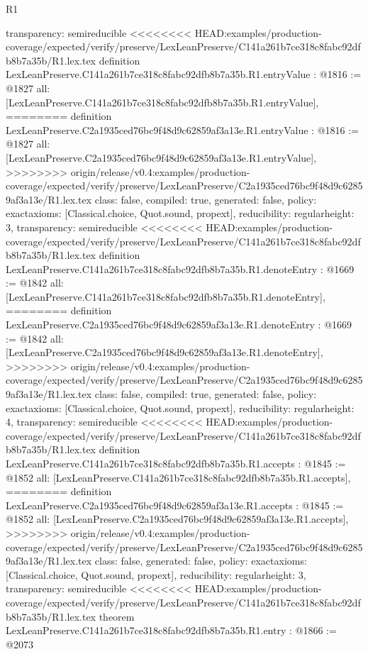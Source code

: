 \begin{lexlean}{R1}
\begin{coremodule}
{{{{{{{{{{{{{{{  transparency: semireducible
}
<<<<<<<< HEAD:examples/production-coverage/expected/verify/preserve/LexLeanPreserve/C141a261b7ce318c8fabc92dfb8b7a35b/R1.lex.tex
definition LexLeanPreserve.C141a261b7ce318c8fabc92dfb8b7a35b.R1.entryValue : @1816 := @1827 {
  all: [LexLeanPreserve.C141a261b7ce318c8fabc92dfb8b7a35b.R1.entryValue],
========
definition LexLeanPreserve.C2a1935ced76bc9f48d9c62859af3a13e.R1.entryValue : @1816 := @1827 {
  all: [LexLeanPreserve.C2a1935ced76bc9f48d9c62859af3a13e.R1.entryValue],
>>>>>>>> origin/release/v0.4:examples/production-coverage/expected/verify/preserve/LexLeanPreserve/C2a1935ced76bc9f48d9c62859af3a13e/R1.lex.tex
  class: false,
  compiled: true,
  generated: false,
  policy: exact{axioms: [Classical.choice, Quot.sound, propext]},
  reducibility: regular{height: 3},
  transparency: semireducible
}
<<<<<<<< HEAD:examples/production-coverage/expected/verify/preserve/LexLeanPreserve/C141a261b7ce318c8fabc92dfb8b7a35b/R1.lex.tex
definition LexLeanPreserve.C141a261b7ce318c8fabc92dfb8b7a35b.R1.denoteEntry : @1669 := @1842 {
  all: [LexLeanPreserve.C141a261b7ce318c8fabc92dfb8b7a35b.R1.denoteEntry],
========
definition LexLeanPreserve.C2a1935ced76bc9f48d9c62859af3a13e.R1.denoteEntry : @1669 := @1842 {
  all: [LexLeanPreserve.C2a1935ced76bc9f48d9c62859af3a13e.R1.denoteEntry],
>>>>>>>> origin/release/v0.4:examples/production-coverage/expected/verify/preserve/LexLeanPreserve/C2a1935ced76bc9f48d9c62859af3a13e/R1.lex.tex
  class: false,
  compiled: true,
  generated: false,
  policy: exact{axioms: [Classical.choice, Quot.sound, propext]},
  reducibility: regular{height: 4},
  transparency: semireducible
}
<<<<<<<< HEAD:examples/production-coverage/expected/verify/preserve/LexLeanPreserve/C141a261b7ce318c8fabc92dfb8b7a35b/R1.lex.tex
definition LexLeanPreserve.C141a261b7ce318c8fabc92dfb8b7a35b.R1.accepts : @1845 := @1852 {
  all: [LexLeanPreserve.C141a261b7ce318c8fabc92dfb8b7a35b.R1.accepts],
========
definition LexLeanPreserve.C2a1935ced76bc9f48d9c62859af3a13e.R1.accepts : @1845 := @1852 {
  all: [LexLeanPreserve.C2a1935ced76bc9f48d9c62859af3a13e.R1.accepts],
>>>>>>>> origin/release/v0.4:examples/production-coverage/expected/verify/preserve/LexLeanPreserve/C2a1935ced76bc9f48d9c62859af3a13e/R1.lex.tex
  class: false,
  generated: false,
  policy: exact{axioms: [Classical.choice, Quot.sound, propext]},
  reducibility: regular{height: 3},
  transparency: semireducible
}
<<<<<<<< HEAD:examples/production-coverage/expected/verify/preserve/LexLeanPreserve/C141a261b7ce318c8fabc92dfb8b7a35b/R1.lex.tex
theorem LexLeanPreserve.C141a261b7ce318c8fabc92dfb8b7a35b.R1.entry : @1866 := @2073 {
}}}}}}}}}}}}}}}}}}
\end{coremodule}
\end{lexlean}
